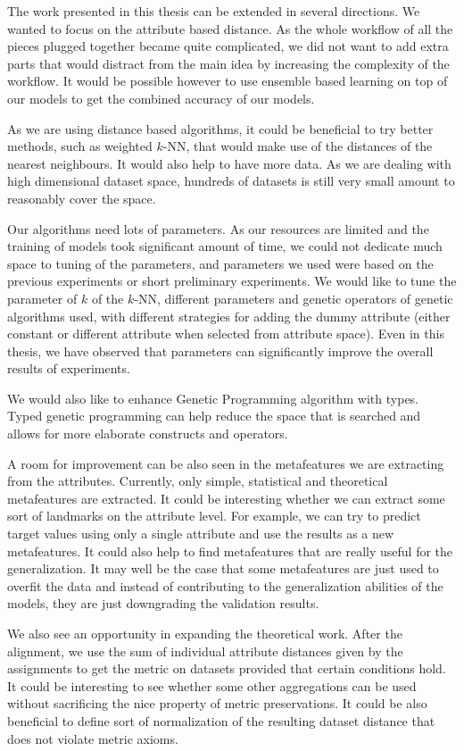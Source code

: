 \documentclass{article}
\begin{document}
\begin{refsegment}
The work presented in this thesis can be extended in several directions. We wanted to focus on the attribute based distance. As the whole workflow of all the pieces plugged together became quite complicated, we did not want to add extra parts that would distract from the main idea by increasing the complexity of the workflow. It would be possible however to use ensemble based learning on top of our models to get the combined accuracy of our models. 

As we are using distance based algorithms, it could be beneficial to try better methods, such as weighted $k$-NN, that would make use of the distances of the nearest neighbours. It would also help to have more data. As we are dealing with high dimensional dataset space, hundreds of datasets is still very small amount to reasonably cover the space. 

Our algorithms need lots of parameters. As our resources are limited and the training of models took significant amount of time, we could not dedicate much space to tuning of the parameters, and parameters we used were based on the previous experiments or short preliminary experiments. We would like to tune the parameter of $k$ of the $k$-NN, different parameters and genetic operators of genetic algorithms used, with different strategies for adding the dummy attribute (either constant or different attribute when selected from attribute space). Even in this thesis, we have observed that parameters can significantly improve the overall results of experiments.

We would also like to enhance Genetic Programming algorithm with types. Typed genetic programming \cite{typedGp,tomCec14} can help reduce the space that is searched and allows for more elaborate constructs and operators.

A room for improvement can be also seen in the metafeatures we are extracting from the attributes. Currently, only simple, statistical and theoretical metafeatures are extracted. It could be interesting whether we can extract some sort of landmarks on the attribute level. For example, we can try to predict target values using only a single attribute and use the results as a new metafeatures. It could also help to find metafeatures that are really useful for the generalization. It may well be the case that some metafeatures are just used to overfit the data and instead of contributing to the generalization abilities of the models, they are just downgrading the validation results.

We also see an opportunity in expanding the theoretical work. After the alignment, we use the sum of individual attribute distances given by the assignments to get the metric on datasets provided that certain conditions hold. It could be interesting to see whether some other aggregations can be used without sacrificing the nice property of metric preservations. It could be also beneficial to define sort of normalization of the resulting dataset distance that does not violate metric axioms.
		
\printbibliography[segment=\therefsegment]
	
\end{refsegment}
\end{document}

